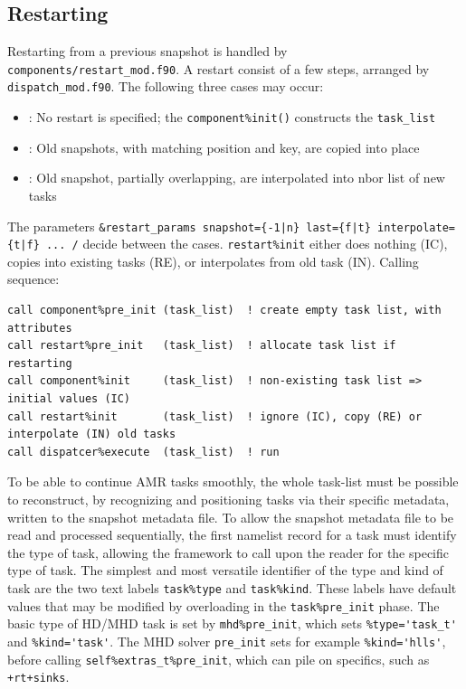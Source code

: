 \documentclass[paper=a4,fontsize=11pt]{scrartcl}
\numberwithin{equation}{section}		%
\numberwithin{figure}{section}			%
\numberwithin{table}{section}				%
\newcommand{\codecolor}{\color{Blue}}
\newcommand{\inputcolor}{\color{Blue}}
\newcommand{\filecolor}{\color{NavyBlue}}
\newcommand{\File}[1]{{\filecolor\texttt{#1}}}
\begin{document}
\subsection{Restarting}
Restarting from a previous snapshot is handled by \File{components/restart\_mod.f90}.  A restart consist of a few steps, arranged by \verb:dispatch_mod.f90:. The following three cases may occur:
\begin{itemize}
    \item[IC]: No restart is specified; the \verb:component%init(): constructs the \verb:task_list:
    \item[RE]: Old snapshots, with matching position and key, are copied into place 
    \item[IN]: Old snapshot, partially overlapping, are interpolated into nbor list of new tasks
\end{itemize}
The parameters {\inputcolor\verb:&restart_params snapshot={-1|n} last={f|t} interpolate={t|f} ... /: } decide between the cases. 
{\codecolor \verb|restart%init| } either does nothing (IC), copies into existing tasks (RE), or interpolates from old task (IN).  
Calling sequence:
{\small\codecolor\begin{verbatim}
call component%pre_init (task_list)  ! create empty task list, with attributes
call restart%pre_init   (task_list)  ! allocate task list if restarting
call component%init     (task_list)  ! non-existing task list => initial values (IC)
call restart%init       (task_list)  ! ignore (IC), copy (RE) or interpolate (IN) old tasks
call dispatcer%execute  (task_list)  ! run
\end{verbatim}}
To be able to continue AMR tasks smoothly, the whole task-list must be possible to reconstruct, by recognizing and positioning tasks via their specific metadata, written to the snapshot metadata file.   To allow the snapshot metadata file to be read and processed sequentially, the first namelist record for a task must identify the type of task, allowing the framework to call upon the reader for the specific type of task.  The simplest and most  versatile identifier of the type and kind of task are the two text labels \verb|task%type| and \verb|task%kind|.  These labels have default values that may be modified by overloading in the \verb|task%pre_init| phase.  The basic type of HD/MHD task is set by  \verb|mhd%pre_init|, which sets \verb|%type='task_t'| and \verb|%kind='task'|.  The MHD solver \verb|pre_init| sets for example \verb|%kind='hlls'|, before calling \verb|self%extras_t%pre_init|, which can pile on specifics, such as \verb|+rt+sinks|.
\end{document}
